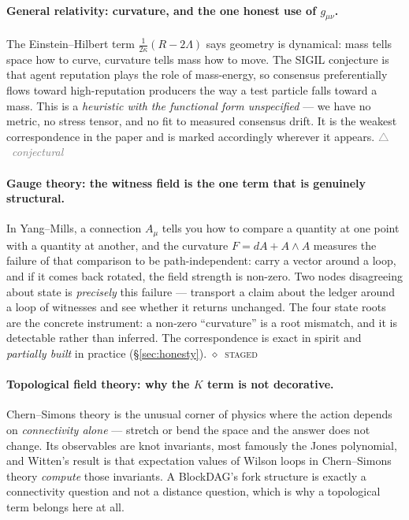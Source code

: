 \documentclass[10pt,a4paper]{article}
\newcommand{\stG}{\textcolor{sigilviolet}{$\diamond$}~{\scriptsize\textcolor{sigilviolet}{\textsc{staged}}}}
\newcommand{\stC}{{\scriptsize\textcolor{gray}{$\triangle$~\textit{conjectural}}}}
\begin{document}
\paragraph{General relativity: curvature, and the one honest use of $g_{\mu\nu}$.}
The Einstein--Hilbert term $\tfrac{1}{2\kappa}(R-2\Lambda)$ says geometry is dynamical: mass
tells space how to curve, curvature tells mass how to move. The SIGIL conjecture is that
agent reputation plays the role of mass-energy, so consensus preferentially flows toward
high-reputation producers the way a test particle falls toward a mass. This is a
\emph{heuristic with the functional form unspecified} --- we have no metric, no stress tensor,
and no fit to measured consensus drift. It is the weakest correspondence in the paper and is
marked accordingly wherever it appears. \stC

\paragraph{Gauge theory: the witness field is the one term that is genuinely structural.}
In Yang--Mills, a connection $A_\mu$ tells you how to compare a quantity at one point with
a quantity at another, and the curvature $F = dA + A \wedge A$ measures the failure of that
comparison to be path-independent: carry a vector around a loop, and if it comes back
rotated, the field strength is non-zero. Two nodes disagreeing about state is
\emph{precisely} this failure --- transport a claim about the ledger around a loop of
witnesses and see whether it returns unchanged. The four state roots are the concrete
instrument: a non-zero ``curvature'' is a root mismatch, and it is detectable rather than
inferred. The correspondence is exact in spirit and \emph{partially built} in practice
(\S\ref{sec:honesty}). \stG

\paragraph{Topological field theory: why the $K$ term is not decorative.}
Chern--Simons theory is the unusual corner of physics where the action depends on
\emph{connectivity alone} --- stretch or bend the space and the answer does not change.
Its observables are knot invariants, most famously the Jones polynomial, and Witten's
result is that expectation values of Wilson loops in Chern--Simons theory \emph{compute}
those invariants. A BlockDAG's fork structure is exactly a connectivity question and not a
distance question, which is why a topological term belongs here at all.
\end{document}
